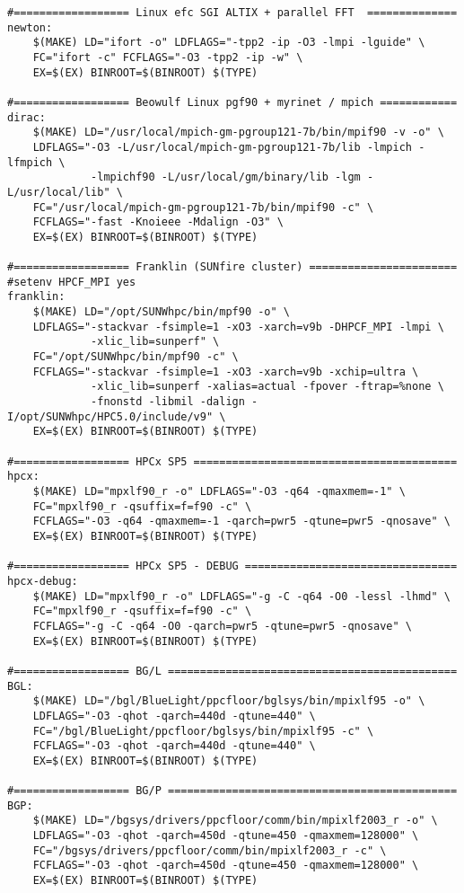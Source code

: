 \begin{verbatim}
#================== Linux efc SGI ALTIX + parallel FFT  ==============
newton:
	$(MAKE) LD="ifort -o" LDFLAGS="-tpp2 -ip -O3 -lmpi -lguide" \
	FC="ifort -c" FCFLAGS="-O3 -tpp2 -ip -w" \
	EX=$(EX) BINROOT=$(BINROOT) $(TYPE)

#================== Beowulf Linux pgf90 + myrinet / mpich ============
dirac:
	$(MAKE) LD="/usr/local/mpich-gm-pgroup121-7b/bin/mpif90 -v -o" \
	LDFLAGS="-O3 -L/usr/local/mpich-gm-pgroup121-7b/lib -lmpich -lfmpich \
	         -lmpichf90 -L/usr/local/gm/binary/lib -lgm -L/usr/local/lib" \
	FC="/usr/local/mpich-gm-pgroup121-7b/bin/mpif90 -c" \
	FCFLAGS="-fast -Knoieee -Mdalign -O3" \
	EX=$(EX) BINROOT=$(BINROOT) $(TYPE)

#================== Franklin (SUNfire cluster) =======================
#setenv HPCF_MPI yes
franklin:
	$(MAKE) LD="/opt/SUNWhpc/bin/mpf90 -o" \
	LDFLAGS="-stackvar -fsimple=1 -xO3 -xarch=v9b -DHPCF_MPI -lmpi \
	         -xlic_lib=sunperf" \
	FC="/opt/SUNWhpc/bin/mpf90 -c" \
	FCFLAGS="-stackvar -fsimple=1 -xO3 -xarch=v9b -xchip=ultra \
	         -xlic_lib=sunperf -xalias=actual -fpover -ftrap=%none \
	         -fnonstd -libmil -dalign -I/opt/SUNWhpc/HPC5.0/include/v9" \
	EX=$(EX) BINROOT=$(BINROOT) $(TYPE)

#================== HPCx SP5 =========================================
hpcx:
	$(MAKE) LD="mpxlf90_r -o" LDFLAGS="-O3 -q64 -qmaxmem=-1" \
	FC="mpxlf90_r -qsuffix=f=f90 -c" \
	FCFLAGS="-O3 -q64 -qmaxmem=-1 -qarch=pwr5 -qtune=pwr5 -qnosave" \
	EX=$(EX) BINROOT=$(BINROOT) $(TYPE)

#================== HPCx SP5 - DEBUG =================================
hpcx-debug:
	$(MAKE) LD="mpxlf90_r -o" LDFLAGS="-g -C -q64 -O0 -lessl -lhmd" \
	FC="mpxlf90_r -qsuffix=f=f90 -c" \
	FCFLAGS="-g -C -q64 -O0 -qarch=pwr5 -qtune=pwr5 -qnosave" \
	EX=$(EX) BINROOT=$(BINROOT) $(TYPE)

#================== BG/L =============================================
BGL:
	$(MAKE) LD="/bgl/BlueLight/ppcfloor/bglsys/bin/mpixlf95 -o" \
	LDFLAGS="-O3 -qhot -qarch=440d -qtune=440" \
	FC="/bgl/BlueLight/ppcfloor/bglsys/bin/mpixlf95 -c" \
	FCFLAGS="-O3 -qhot -qarch=440d -qtune=440" \
	EX=$(EX) BINROOT=$(BINROOT) $(TYPE)

#================== BG/P =============================================
BGP:
	$(MAKE) LD="/bgsys/drivers/ppcfloor/comm/bin/mpixlf2003_r -o" \
	LDFLAGS="-O3 -qhot -qarch=450d -qtune=450 -qmaxmem=128000" \
	FC="/bgsys/drivers/ppcfloor/comm/bin/mpixlf2003_r -c" \
	FCFLAGS="-O3 -qhot -qarch=450d -qtune=450 -qmaxmem=128000" \
	EX=$(EX) BINROOT=$(BINROOT) $(TYPE)


\end{verbatim}
